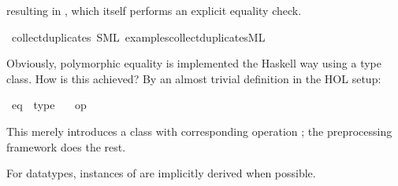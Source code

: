 \begin{isabellebody}
\begin{isamarkuptext}
  resulting in , which itself
  performs an explicit equality check.%
\end{isamarkuptext}%
\isamarkuptrue%
\isamarkupfalse%
\ collect{\isacharunderscore}duplicates\ {\isacharparenleft}SML\ {\isachardoublequoteopen}examples{\isacharslash}collect{\isacharunderscore}duplicates{\isachardot}ML{\isachardoublequoteclose}{\isacharparenright}%
\begin{isamarkuptext}%
%
\end{isamarkuptext}%
\isamarkuptrue%
%
\begin{isamarkuptext}%
Obviously, polymorphic equality is implemented the Haskell
  way using a type class.  How is this achieved?  By an
  almost trivial definition in the HOL setup:%
\end{isamarkuptext}%
\isamarkuptrue%
%
\isadelimML
%
\endisadelimML
%
\isatagML
%
\endisatagML
{\isafoldML}%
%
\isadelimML
%
\endisadelimML
\isanewline
{}\isamarkupfalse%
\ eq\ {\isasymsubseteq}\ type\isanewline
\ \ {\isacharparenleft}\ {\isachardoublequoteopen}op\ {\isacharequal}{\isachardoublequoteclose}{\isacharparenright}%
\begin{isamarkuptext}%
This merely introduces a class  with corresponding
  operation ;
  the preprocessing framework does the rest.%
\end{isamarkuptext}%
\isamarkuptrue%
%
\isadelimML
%
\endisadelimML
%
\isatagML
%
\endisatagML
{\isafoldML}%
%
\isadelimML
%
\endisadelimML
%
\begin{isamarkuptext}%
For datatypes, instances of  are implicitly derived
  when possible.


\end{isamarkuptext}
\end{isabellebody}
